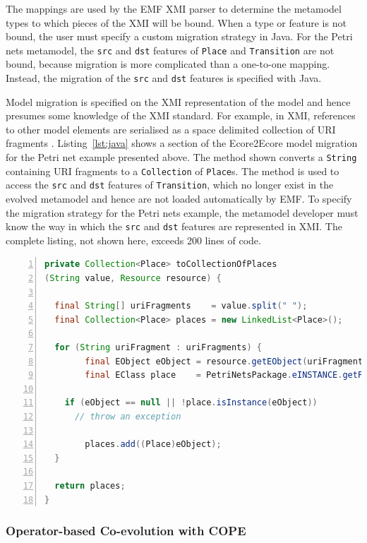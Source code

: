 The mappings are used by the EMF XMI parser to determine the metamodel types to which pieces of the XMI will be bound. When a type or feature is not bound, the user must specify a custom migration strategy in Java. For the Petri nets metamodel, the \texttt{src} and \texttt{dst} features of \texttt{Place} and \texttt{Transition} are not bound, because migration is more complicated than a one-to-one mapping. Instead, the migration of the \texttt{src} and \texttt{dst} features is specified with Java.

Model migration is specified on the XMI representation of the model and hence presumes some knowledge of the XMI standard. For example, in XMI, references to other model elements are serialised as a space delimited collection of URI fragments \cite{steinberg09emf}. Listing~\ref{lst:java} shows a section of the Ecore2Ecore model migration for the Petri net example presented above. The method shown converts a \texttt{String} containing URI fragments to a \texttt{Collection} of \texttt{Place}s. The method is used to access the \texttt{src} and \texttt{dst} features of \texttt{Transition}, which no longer exist in the evolved metamodel and hence are not loaded automatically by EMF. To specify the migration strategy for the Petri nets example, the metamodel developer must know the way in which the \texttt{src} and \texttt{dst} features are represented in XMI. The complete listing, not shown here, exceeds 200 lines of code.

\begin{lstlisting}[basicstyle=\ttfamily\footnotesize, flexiblecolumns=true, numbers=left, nolol=true, caption=Java method for deserialising a reference., label=lst:java, language=Java, tabsize=2]
private Collection<Place> toCollectionOfPlaces
(String value, Resource resource) {

  final String[] uriFragments    = value.split(" ");
  final Collection<Place> places = new LinkedList<Place>();
 
  for (String uriFragment : uriFragments) {
		final EObject eObject = resource.getEObject(uriFragment);
		final EClass place    = PetriNetsPackage.eINSTANCE.getPlace();

    if (eObject == null || !place.isInstance(eObject))
      // throw an exception
						
		places.add((Place)eObject);
  }
 
  return places;
}
\end{lstlisting}

\subsubsection{Operator-based Co-evolution with COPE}
\label{subsubsec:cope}

